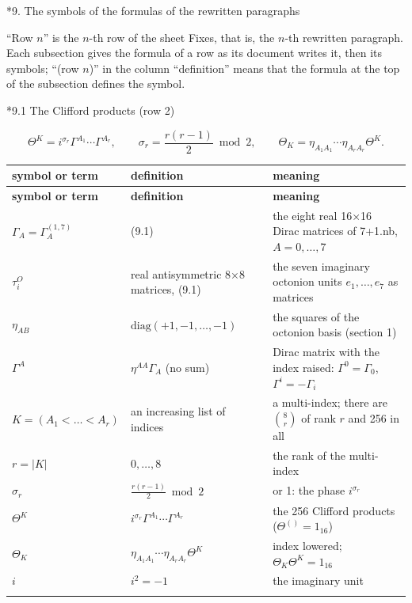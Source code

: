 \documentclass[10pt,a4paper]{article}
\makeatletter
\renewcommand\section{\@startsection{section}{1}{\z@}{-3.5ex \@plus -1ex \@minus -.2ex}{2.3ex \@plus.2ex}{\normalfont\Large\bfseries\raggedright}}
\renewcommand\subsection{\@startsection{subsection}{2}{\z@}{-3.25ex\@plus -1ex \@minus -.2ex}{1.5ex \@plus .2ex}{\normalfont\large\bfseries\raggedright}}
\makeatother
\begin{document}
\section*{9. The symbols of the formulas of the rewritten paragraphs}
“Row $n$” is the $n$-th row of the sheet Fixes, that is, the $n$-th rewritten paragraph. Each subsection gives the formula of a row as its document writes it, then its symbols; “(row $n$)” in the column “definition” means that the formula at the top of the subsection defines the symbol.

\subsection*{9.1 The Clifford products (row 2)}
\begin{equation*}
\Theta^K=i^{\sigma_r}\Gamma^{A_1}\cdots\Gamma^{A_r},\qquad \sigma_r=\frac{r(r-1)}2\bmod2,\qquad \Theta_K=\eta_{A_1A_1}\cdots\eta_{A_rA_r}\Theta^K .
\end{equation*}
{\footnotesize
\begin{longtable}{>{\raggedright\arraybackslash}p{}>{\raggedright\arraybackslash}p{}>{\raggedright\arraybackslash}p{}}
\toprule
\textbf{symbol or term} & \textbf{definition} & \textbf{meaning} \\
\midrule\endfirsthead
\toprule
\textbf{symbol or term} & \textbf{definition} & \textbf{meaning} \\
\midrule\endhead
\endfoot
\bottomrule\endlastfoot
$\Gamma_A=\Gamma^{(1,7)}_A$ & (9.1) & the eight real 16×16 Dirac matrices of 7+1.nb, $A=0,\dots,7$ \\
$\tau^O_i$ & real antisymmetric 8×8 matrices, (9.1) & the seven imaginary octonion units $e_1,\dots,e_7$ as matrices \\
$\eta_{AB}$ & $\mathrm{diag}(+1,-1,\dots,-1)$ & the squares of the octonion basis (section 1) \\
$\Gamma^A$ & $\eta^{AA}\Gamma_A$ (no sum) & Dirac matrix with the index raised: $\Gamma^0=\Gamma_0$, $\Gamma^i=-\Gamma_i$ \\
$K=(A_1<\dots<A_r)$ & an increasing list of indices & a multi-index; there are $\binom8r$ of rank $r$ and 256 in all \\
$r=|K|$ & $0,\dots,8$ & the rank of the multi-index \\
$\sigma_r$ & $\frac{r(r-1)}2\bmod2$ & 0 or 1: the phase $i^{\sigma_r}$ \\
$\Theta^K$ & $i^{\sigma_r}\Gamma^{A_1}\cdots\Gamma^{A_r}$ & the 256 Clifford products ($\Theta^{()}=1_{16}$) \\
$\Theta_K$ & $\eta_{A_1A_1}\cdots\eta_{A_rA_r}\Theta^K$ & index lowered; $\Theta_K\Theta^K=1_{16}$ \\
$i$ & $i^2=-1$ & the imaginary unit \\*
\end{longtable}}
\end{document}
